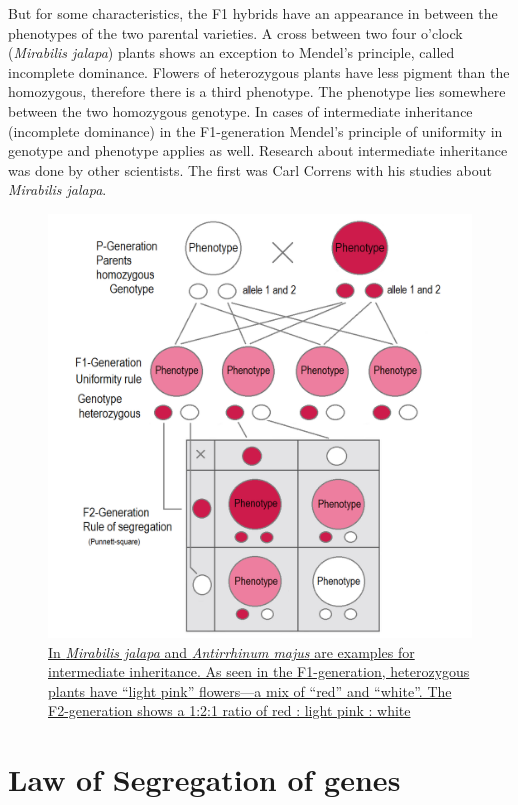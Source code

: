 But for some characteristics, the F1 hybrids have an appearance in between the phenotypes of the two parental varieties. A cross between two four o'clock (\emph{Mirabilis jalapa}) plants shows an exception to Mendel's principle, called incomplete dominance. Flowers of heterozygous plants have less pigment than the homozygous, therefore there is a third phenotype. The phenotype lies somewhere between the two homozygous genotype. In cases of intermediate inheritance (incomplete dominance) in the F1-generation Mendel's principle of uniformity in genotype and phenotype applies as well. Research about intermediate inheritance was done by other scientists. The first was Carl Correns with his studies about \emph{Mirabilis jalapa}.



\begin{figure}

{\centering \includegraphics[width=0.7\linewidth]{./figures/mendel/Intermediate_inheritance_P_-_F1_-_F2} 

}

\caption{\href{https://commons.wikimedia.org/wiki/File:Intermediate_inheritance_P_-_F1_-_F2.png}{In \emph{Mirabilis jalapa} and \emph{Antirrhinum majus} are examples for intermediate inheritance. As seen in the F1-generation, heterozygous plants have ``light pink'' flowers---a mix of ``red'' and ``white''. The F2-generation shows a 1:2:1 ratio of red : light pink : white}}\label{fig:intermediateinheritance}
\end{figure}

\hypertarget{law-of-segregation-of-genes}{%
\section{Law of Segregation of genes}\label{law-of-segregation-of-genes}}

